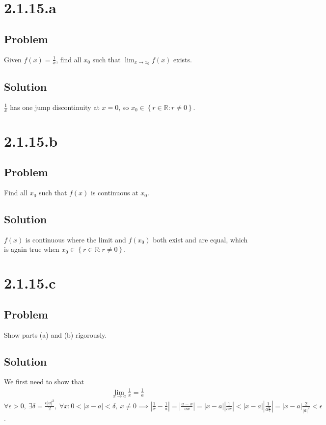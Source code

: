 \documentclass[12pt]{article}
\newcommand{\curly}[1]{\left\{      #1 \right\}     }
\newcommand{\abs}  [1]{\left|       #1 \right|      }
\begin{document}
\section*{2.1.15.a}

\subsection*{Problem}
Given $f(x) = \frac{1}{x}$, find all $x_0$ such that $\lim_{x \to x_0} f(x)$ exists.

\subsection*{Solution}
$\frac{1}{x}$ has one jump discontinuity at $x = 0$, so $x_0 \in \curly{r \in \mathbb{R} : r \neq 0}$.



\section*{2.1.15.b}

\subsection*{Problem}
Find all $x_0$ such that $f(x)$ is continuous at $x_0$.

\subsection*{Solution}
$f(x)$ is continuous where the limit and $f(x_0)$ both exist and are equal, which is again true when $x_0 \in \curly{r \in \mathbb{R} : r \neq 0}$.



\section*{2.1.15.c}

\subsection*{Problem}
Show parts (a) and (b) rigorously.

\subsection*{Solution}
We first need to show that
\begin{align*}
    \lim_{x \to a} \frac{1}{x} = \frac{1}{a}
\end{align*}
$\forall \epsilon > 0,\ \exists \delta = \frac{\epsilon \abs{a}^2}{2},\ \forall x : 0 < \abs{x - a} < \delta,\ x \neq 0 \implies \abs{\frac{1}{x} - \frac{1}{a}} = \abs{\frac{a - x}{ax}} = \abs{x - a} \abs{\frac{1}{ax}} < \abs{x - a} \abs{\frac{1}{a \frac{a}{2}}} = \abs{x - a} \frac{2}{\abs{a}^2} < \epsilon$.
\end{document}
